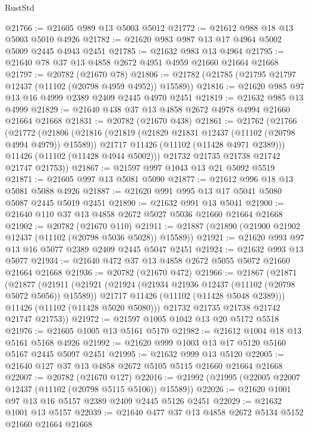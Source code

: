 \begin{lexlean}{RustStd}
\begin{coremodule}
@21766 := @21605 @989 @13 @5003 @5012
@21772 := @21612 @988 @18 @13 @5003 @5010 @4926
@21782 := @21620 @983 @987 @13 @17 @4964 @5002 @5009 @2445 @4943 @2451
@21785 := @21632 @983 @13 @4964
@21795 := @21640 @78 @37 @13 @4858 @2672 @4951 @4959 @21660 @21664 @21668
@21797 := @20782 (@21670 @78)
@21806 := @21782 (@21785 (@21795 @21797 @12437 (@11102 (@20798 @4959 @4952)) @15589))
@21816 := @21620 @985 @97 @13 @16 @4999 @2389 @2409 @2445 @4970 @2451
@21819 := @21632 @985 @13 @4999
@21829 := @21640 @438 @37 @13 @4858 @2672 @4978 @4994 @21660 @21664 @21668
@21831 := @20782 (@21670 @438)
@21861 := @21762
    (@21766
      (@21772
        (@21806
          (@21816
            (@21819 (@21829 @21831 @12437 (@11102 (@20798 @4994 @4979)) @15589))
            @21717
            @11426
            (@11102 (@11428 @4971 @2389)))
          @11426
          (@11102 (@11428 @4944 @5002)))
        @21732
        @21735
        @21738
        @21742
        @21747
        @21753))
@21867 := @21597 @997 @1043 @13 @21 @5092 @5519
@21871 := @21605 @997 @13 @5081 @5090
@21877 := @21612 @996 @18 @13 @5081 @5088 @4926
@21887 := @21620 @991 @995 @13 @17 @5041 @5080 @5087 @2445 @5019 @2451
@21890 := @21632 @991 @13 @5041
@21900 := @21640 @110 @37 @13 @4858 @2672 @5027 @5036 @21660 @21664 @21668
@21902 := @20782 (@21670 @110)
@21911 := @21887 (@21890 (@21900 @21902 @12437 (@11102 (@20798 @5036 @5028)) @15589))
@21921 := @21620 @993 @97 @13 @16 @5077 @2389 @2409 @2445 @5047 @2451
@21924 := @21632 @993 @13 @5077
@21934 := @21640 @472 @37 @13 @4858 @2672 @5055 @5072 @21660 @21664 @21668
@21936 := @20782 (@21670 @472)
@21966 := @21867
    (@21871
      (@21877
        (@21911
          (@21921
            (@21924 (@21934 @21936 @12437 (@11102 (@20798 @5072 @5056)) @15589))
            @21717
            @11426
            (@11102 (@11428 @5048 @2389)))
          @11426
          (@11102 (@11428 @5020 @5080)))
        @21732
        @21735
        @21738
        @21742
        @21747
        @21753))
@21972 := @21597 @1005 @1042 @13 @20 @5172 @5518
@21976 := @21605 @1005 @13 @5161 @5170
@21982 := @21612 @1004 @18 @13 @5161 @5168 @4926
@21992 := @21620 @999 @1003 @13 @17 @5120 @5160 @5167 @2445 @5097 @2451
@21995 := @21632 @999 @13 @5120
@22005 := @21640 @127 @37 @13 @4858 @2672 @5105 @5115 @21660 @21664 @21668
@22007 := @20782 (@21670 @127)
@22016 := @21992 (@21995 (@22005 @22007 @12437 (@11102 (@20798 @5115 @5106)) @15589))
@22026 := @21620 @1001 @97 @13 @16 @5157 @2389 @2409 @2445 @5126 @2451
@22029 := @21632 @1001 @13 @5157
@22039 := @21640 @477 @37 @13 @4858 @2672 @5134 @5152 @21660 @21664 @21668

\end{coremodule}
\end{lexlean}
